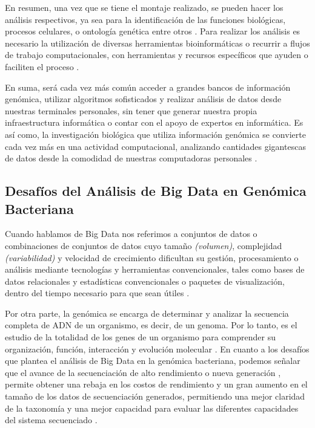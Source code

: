 \documentclass[12pt]{article}
\begin{document}
En resumen, una vez que se tiene el montaje realizado, se pueden hacer los análisis 
respectivos, ya sea para la identificación de las funciones biológicas, procesos 
celulares, o ontología genética entre otros \cite{LGAAP}. Para realizar los análisis es necesario 
la utilización de diversas herramientas bioinformáticas o recurrir a flujos de trabajo 
computacionales, con herramientas y recursos específicos que ayuden o 
faciliten el proceso \cite{Lee}.

En suma, será cada vez más común acceder a grandes bancos de información genómica, 
utilizar algoritmos sofisticados y realizar análisis de datos desde nuestras 
terminales personales, sin tener que generar nuestra propia infraestructura informática o 
contar con el apoyo de expertos en informática. Es así como, la investigación biológica que 
utiliza información genómica se convierte cada vez más en una actividad computacional, 
analizando cantidades gigantescas de datos desde la comodidad de nuestras computadoras 
personales \cite{Moran}.

\subsection*{Desafíos del Análisis de Big Data en Genómica Bacteriana}

Cuando hablamos de Big Data nos referimos a conjuntos de datos o combinaciones de 
conjuntos de datos cuyo tamaño \emph{(volumen)}, complejidad \emph{(variabilidad)} y velocidad de 
crecimiento dificultan su gestión, procesamiento o análisis mediante tecnologías y 
herramientas convencionales, tales como bases de datos relacionales y estadísticas 
convencionales o paquetes de visualización, dentro del tiempo necesario para que 
sean útiles \cite{PowerData}.

Por otra parte, la genómica se encarga de determinar y analizar la secuencia 
completa de ADN de un organismo, es decir, de un genoma. Por lo tanto, es el 
estudio de la totalidad de los genes de un organismo para comprender su organización, 
función, interacción y evolución molecular \cite{Arauco}. En cuanto a los desafíos que plantea 
el análisis de Big Data en la genómica bacteriana, podemos señalar que el avance de la 
secuenciación de alto rendimiento o nueva generación \cite{Conogasi}, permite obtener una rebaja en 
los costos de rendimiento y un gran aumento en el tamaño de los datos de secuenciación 
generados, permitiendo una mejor claridad de la taxonomía y una mejor capacidad para 
evaluar las diferentes capacidades del sistema secuenciado \cite{Cortes}.
\end{document}
